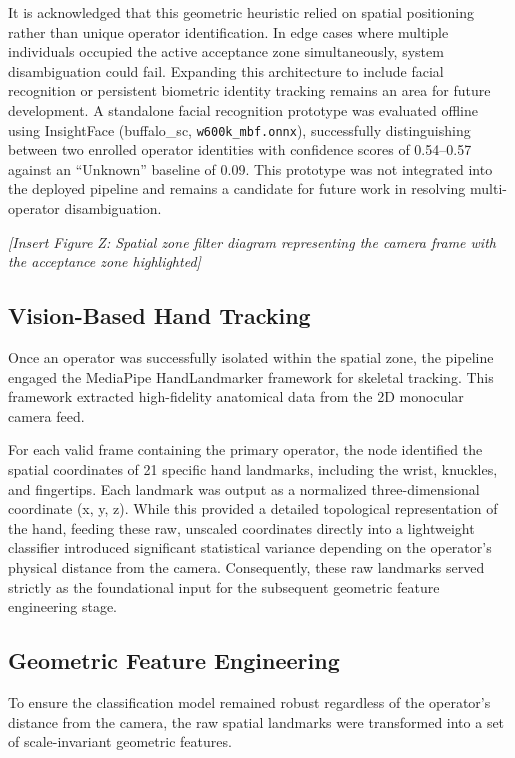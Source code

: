 It is acknowledged that this geometric heuristic relied on spatial positioning rather than unique operator identification. In edge cases where multiple individuals occupied the active acceptance zone simultaneously, system disambiguation could fail. Expanding this architecture to include facial recognition or persistent biometric identity tracking remains an area for future development. A standalone facial recognition prototype was evaluated offline using InsightFace (buffalo\_sc, \texttt{w600k\_mbf.onnx}), successfully distinguishing between two enrolled operator identities with confidence scores of 0.54--0.57 against an ``Unknown'' baseline of 0.09. This prototype was not integrated into the deployed pipeline and remains a candidate for future work in resolving multi-operator disambiguation.

\textit{[Insert Figure Z: Spatial zone filter diagram representing the camera frame with the acceptance zone highlighted]}

\subsection{Vision-Based Hand Tracking}
Once an operator was successfully isolated within the spatial zone, the pipeline engaged the MediaPipe HandLandmarker framework \cite{lugaresi2019mediapipe} for skeletal tracking. This framework extracted high-fidelity anatomical data from the 2D monocular camera feed.

For each valid frame containing the primary operator, the node identified the spatial coordinates of 21 specific hand landmarks, including the wrist, knuckles, and fingertips. Each landmark was output as a normalized three-dimensional coordinate (x, y, z). While this provided a detailed topological representation of the hand, feeding these raw, unscaled coordinates directly into a lightweight classifier introduced significant statistical variance depending on the operator's physical distance from the camera. Consequently, these raw landmarks served strictly as the foundational input for the subsequent geometric feature engineering stage.

\subsection{Geometric Feature Engineering}
To ensure the classification model remained robust regardless of the operator's distance from the camera, the raw spatial landmarks were transformed into a set of scale-invariant geometric features. 

